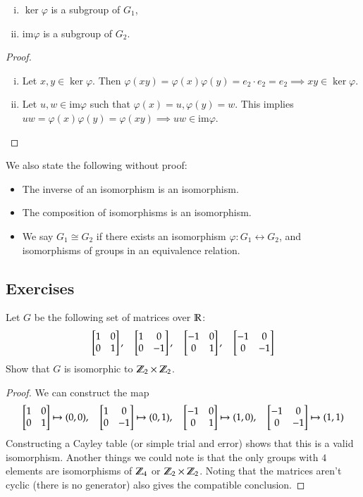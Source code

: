 \begin{proposition}
\!
\begin{enumerate}[(i)]
	\item $\ker \varphi$ is a subgroup of $G_1$, 
	\item $\mathrm{im} \varphi$ is a subgroup of $G_2$. 
\end{enumerate}	
\end{proposition}

\begin{proof}
\!
\begin{enumerate}[(i)]
	\item Let $x, y\in \ker \varphi$. Then $\varphi(xy)=\varphi(x)\varphi(y)=e_2\cdot e_2=e_2\implies xy\in \ker \varphi$. 
	\item Let $u, w\in \mathrm{im} \varphi$ such that $\varphi(x) = u, \varphi(y) = w$. This implies $uw = \varphi(x)\varphi(y) = \varphi(xy)\implies uw\in \mathrm{im}\varphi$. 
\end{enumerate}	
\end{proof}

We also state the following without proof: 
\begin{itemize}
\item The inverse of an isomorphism is an isomorphism. 
\item The composition of isomorphisms is an isomorphism. 
\item We say $G_1\cong G_2$ if there exists an isomorphism $\varphi: G_1\leftrightarrow G_2$, and isomorphisms of groups in an equivalence relation. 	
\end{itemize}

\subsection{Exercises}

\exercise Let $G$ be the following set of matrices over $\mathbb{R}$: 
\[\mtrx{1 & 0 \\ 0 & 1}, \quad \mtrx{1 & 0 \\ 0 & -1}, \quad \mtrx{-1 & 0 \\ 0 & 1}, \quad \mtrx{-1 & 0 \\ 0 & -1}\]
Show that $G$ is isomorphic to $\mathbb{Z}_2\times \mathbb{Z}_2$. 
\begin{proof}
We can construct the map 
\[\mtrx{1 & 0 \\ 0 & 1} \mapsto (0,0), \quad \mtrx{1 & 0 \\ 0 & -1}  \mapsto (0, 1), \quad \mtrx{-1 & 0 \\ 0 & 1}  \mapsto (1, 0), \quad \mtrx{-1 & 0 \\ 0 & -1}  \mapsto (1,1)\]
Constructing a Cayley table (or simple trial and error) shows that this is a valid isomorphism. Another things we could note is that the only groups with $4$ elements are isomorphisms of $\mathbb{Z}_4$ or $\mathbb{Z}_2\times\mathbb{Z}_2$. Noting that the matrices aren't cyclic (there is no generator) also gives the compatible conclusion. 
\end{proof}


